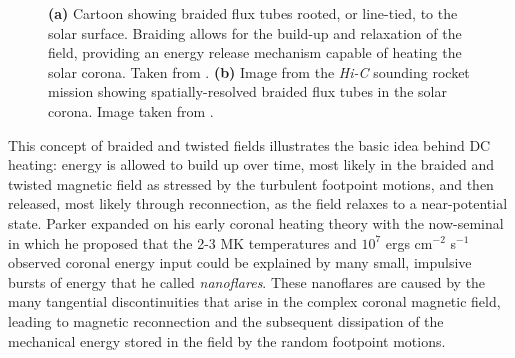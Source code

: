 \begin{figure}
	\centering
	\caption{\textbf{(a)} Cartoon showing braided flux tubes rooted, or line-tied, to the solar surface. Braiding allows for the build-up and relaxation of the field, providing an energy release mechanism capable of heating the solar corona. Taken from \citet{parker_magnetic_1983-1}. \textbf{(b)} Image from the \textit{Hi-C} sounding rocket mission showing spatially-resolved braided flux tubes in the solar corona. Image taken from \citet{cirtain_energy_2013}.}
	\label{fig:coronal_braids}
\end{figure}
%
\par This concept of braided and twisted fields illustrates the basic idea behind DC heating: energy is allowed to build up over time, most likely in the braided and twisted magnetic field as stressed by the turbulent footpoint motions, and then released, most likely through reconnection, as the field relaxes to a near-potential state. Parker expanded on his early coronal heating theory with the now-seminal \citep{parker_nanoflares_1988} in which he proposed that the 2-3 MK temperatures and $10^7$ ergs cm$^{-2}$ s$^{-1}$ observed coronal energy input \citep{withbroe_mass_1977} could be explained by many small, impulsive bursts of energy that he called \textit{nanoflares}. These nanoflares are caused by the many tangential discontinuities that arise in the complex coronal magnetic field, leading to magnetic reconnection and the subsequent dissipation of the mechanical energy stored in the field by the random footpoint motions. 

